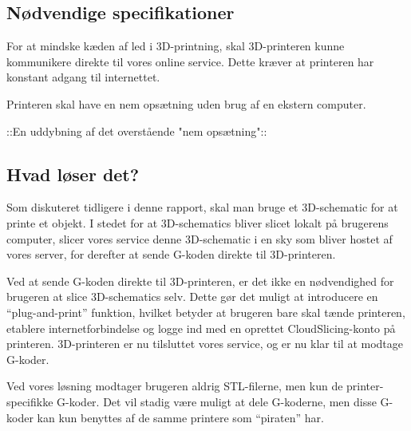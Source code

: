 


\subsection{Nødvendige specifikationer} %
\label{sub:krav_til_3d_teknologien}

For at mindske kæden af led i 3D-printning, skal 3D-printeren kunne kommunikere direkte til vores online service. Dette kræver at printeren har konstant adgang til internettet.

Printeren skal have en nem opsætning uden brug af en ekstern computer.

::En uddybning af det overstående "nem opsætning"::

\subsection{Hvad løser det?} %
\label{sub:hvad_l_ser_det_}

Som diskuteret tidligere i denne rapport, skal man bruge et 3D-schematic for at printe et objekt. I stedet for at 3D-schematics bliver slicet lokalt på brugerens computer, slicer vores service denne 3D-schematic i en sky som bliver hostet af vores server, for derefter at sende G-koden direkte til 3D-printeren. 

Ved at sende G-koden direkte til 3D-printeren, er det ikke en nødvendighed for brugeren at slice 3D-schematics selv. Dette gør det muligt at introducere en ``plug-and-print'' funktion, hvilket betyder at brugeren bare skal tænde printeren, etablere internetforbindelse og logge ind med en oprettet CloudSlicing-konto på printeren. 3D-printeren er nu tilsluttet vores service, og er nu klar til at modtage G-koder.

Ved vores løsning modtager brugeren aldrig STL-filerne, men kun de printer-specifikke G-koder. Det vil stadig være muligt at dele G-koderne, men disse G-koder kan kun benyttes af de samme printere som ``piraten'' har.






